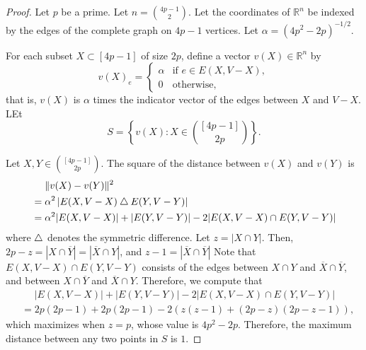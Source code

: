 \begin{proof}
    Let \(p\) be a prime.
    Let \(n = \binom{4p-1}{2}\).
    Let the coordinates of \(\mathbb{R}^n\) be indexed by the edges of the complete graph on \(4p-1\) vertices.
    Let \(\alpha = \left(4p^2 -2p\right)^{-1/2}\).

    For each subset \(X \subset [4p-1]\) of size \(2p\),
    define a vector \(v(X) \in \mathbb{R}^n\) by
    \begin{equation}
        v(X)_e = 
        \begin{cases}
            \alpha & \text{if } e \in E(X, V-X), \\
            0 & \text{otherwise},
        \end{cases}
    \end{equation}
    that is, \(v(X)\) is \(\alpha\) times the indicator vector of the edges between \(X\) and \(V-X\).
    LEt
    \begin{equation}
        S = \left\{ v(X) : X \in \binom{[4p-1]}{2p} \right\}.
    \end{equation}

    Let \(X, Y \in \binom{[4p-1]}{2p}\).
    The square of the distance between \(v(X)\) and \(v(Y)\) is
    \begin{align}
        &\mathrel{\phantom{=}} \|v(X) - v(Y)\|^2 \\
        &= \alpha^2 \left| E(X, V-X) \mathbin{\triangle} E(Y, V-Y) \right| \\
        &= \alpha^2 |E(X, V-X)| + |E(Y, V-Y)| - 2|E(X, V-X) \cap E(Y, V-Y)|
    \end{align}
    where \(\mathbin{\triangle}\) denotes the symmetric difference.
    Let \(z = |X \cap Y|\).
    Then, \(2p-z = |X \cap \overline{Y}| = |\overline{X} \cap Y|\),
    and \(z - 1 = |\overline{X} \cap \overline{Y}|\)
    Note that \(E(X, V-X) \cap E(Y, V-Y)\) consists of the edges between \(X \cap Y\) and \(\overline{X} \cap \overline{Y}\), and between \(X \cap \overline{Y}\) and \(\overline{X} \cap Y\).
    Therefore, we compute that 
    \begin{align}
        &\mathrel{\phantom{=}}
        |E(X, V-X)| + |E(Y, V-Y)| - 2|E(X, V-X) \cap E(Y, V-Y)| \\
        &= 2p(2p-1) + 2p(2p-1) - 2\left(z(z-1) + (2p-z)(2p-z-1)\right),
    \end{align}
    which maximizes when \(z = p\), whose value is \(4p^2 - 2p\).
    Therefore, the maximum distance between any two points in \(S\) is \(1\).


\end{proof}
